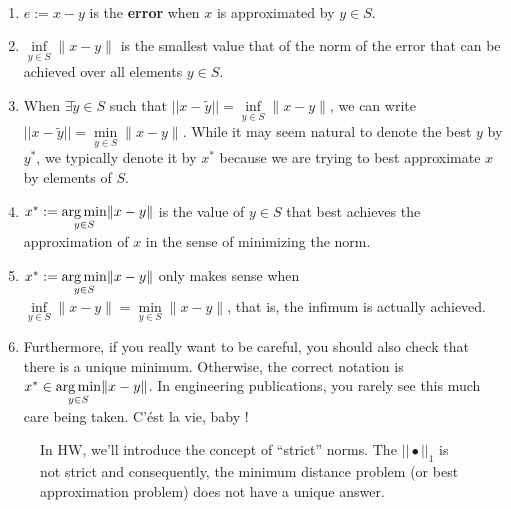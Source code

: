 \begin{rem}  \mbox{ }
\begin{enumerate}
         \renewcommand{\labelenumi}{(\alph{enumi})}
        \setlength{\itemsep}{.1cm}
    \item $e:=x-y$ is the \textbf{error} when $x$ is approximated by $y \in S$.  
    \item $\underset{y \in S}{\inf}\|x-y\|$ is the smallest value that of the norm of the error that can be achieved over all elements $y\in S$. 
    \item When $\exists \widetilde{y} \in S$ such that $||x-\widetilde{y}|| =  \underset{y \in S}{\inf}  \|x-y\|$, we can write $||x-\widetilde{y}|| =  \underset{y \in S}{\min }\|x-y\|$. While it may seem natural to denote the best $y$ by $y^\ast$, we typically denote it by $x^\ast$ because we are trying to best approximate $x$ by elements of $S$.
    \item $x^\ast  := \underset{y \in S}{\operatorname*{arg\,min}} \|x-y\|$ is the value of $y\in S$ that best achieves the approximation of $x$ in the sense of minimizing the norm.
    \item $x^\ast  := {\underset{y \in S}{\operatorname*{arg\,min}}} \|x-y\|$ only makes sense when ${\underset{y \in S}{\operatorname{\inf}}} \|x-y\| = {\underset{y \in S}{\operatorname{\min}}} \|x-y\|$, that is, the infimum is actually achieved. 
    \item Furthermore, if you really want to be careful, you should also check that there is a unique minimum. Otherwise, the correct notation is $x^\ast  \in  {\underset{y \in S}{\operatorname*{arg\,min}}} \|x-y\|$. In engineering publications, you rarely see this much care being taken. C'\'est la vie, baby !
\end{enumerate}

\end{rem}


\begin{figure}[htb!]%
    \caption[]{In HW, we'll introduce the concept of ``strict'' norms. The $|| \bullet ||_1$ is not strict and consequently, the minimum distance problem (or best approximation problem) does not have a unique answer. }
    \label{fig:NonUniqueMinimizingVector}
\end{figure} 

